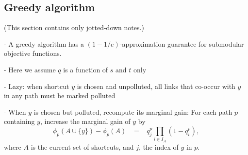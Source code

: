 \documentclass[11pt,letterpaper]{article}
\begin{document}
\subsection{Greedy algorithm}

(This section contains only jotted-down notes.)

- A greedy algorithm has a $(1-1/e)$-approximation guarantee for submodular objective functions.

- Here we assume $q$ is a function of $s$ and $t$ only

- Lazy: when shortcut $y$ is chosen and unpolluted, all links that co-occur with $y$ in any path must be marked polluted

- When $y$ is chosen but polluted, recompute its marginal gain: For each path $p$ containing $y$, increase the marginal gain of $y$ by 
$$\phi_p(A \cup \{y\}) - \phi_p(A)
\;\;\;=\;\;\; q^p_j \prod_{i \in I_A} \left( 1 - q^p_i \right),$$
where $A$ is the current set of shortcuts, and $j$, the index of $y$ in $p$.
\end{document}
